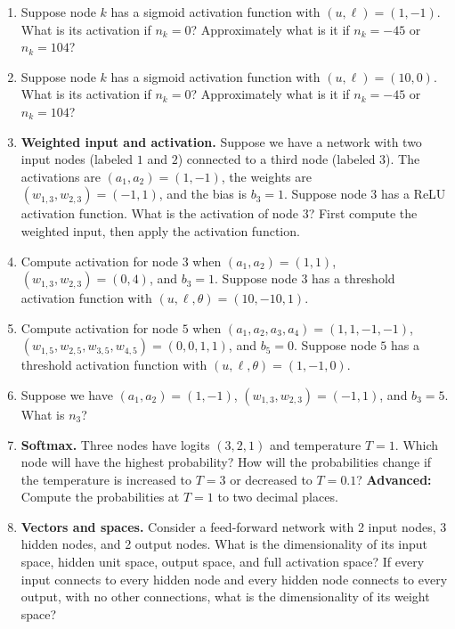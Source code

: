 \begin{enumerate}
\item Suppose node $k$ has a sigmoid activation function with $(u,\ell)=(1,-1)$. What is its activation if $n_k=0$? Approximately what is it if $n_k=-45$ or $n_k=104$?

\item Suppose node $k$ has a sigmoid activation function with $(u,\ell)=(10,0)$. What is its activation if $n_k=0$? Approximately what is it if $n_k=-45$ or $n_k=104$?

\item \textbf{Weighted input and activation.} Suppose we have a network with two input nodes (labeled $1$ and $2$) connected to a third node (labeled $3$). The activations are $(a_1,a_2)=(1,-1)$, the weights are $(w_{1,3},w_{2,3})=(-1,1)$, and the bias is $b_3=1$. Suppose node $3$ has a ReLU activation function. What is the activation of node $3$? First compute the weighted input, then apply the activation function.

\item Compute activation for node $3$ when $(a_1,a_2)=(1,1)$, $(w_{1,3},w_{2,3})=(0,4)$, and $b_3=1$. Suppose node $3$ has a threshold activation function with $(u,\ell,\theta)=(10,-10,1)$.

\item Compute activation for node $5$ when $(a_1,a_2,a_3,a_4)=(1,1,-1,-1)$, $(w_{1,5},w_{2,5},w_{3,5},w_{4,5})=(0,0,1,1)$, and $b_5=0$. Suppose node $5$ has a threshold activation function with $(u,\ell,\theta)=(1,-1,0)$.

\item Suppose we have $(a_1,a_2)=(1,-1)$, $(w_{1,3},w_{2,3})=(-1,1)$, and $b_3=5$. What is $n_3$?

\item \textbf{Softmax.} Three nodes have logits $(3,2,1)$ and temperature $T=1$. Which node will have the highest probability? How will the probabilities change if the temperature is increased to $T=3$ or decreased to $T=0.1$? \textbf{Advanced:} Compute the probabilities at $T=1$ to two decimal places.

\item \textbf{Vectors and spaces.} Consider a feed-forward network with 2 input nodes, 3 hidden nodes, and 2 output nodes. What is the dimensionality of its input space, hidden unit space, output space, and full activation space? If every input connects to every hidden node and every hidden node connects to every output, with no other connections, what is the dimensionality of its weight space?


\end{enumerate}
